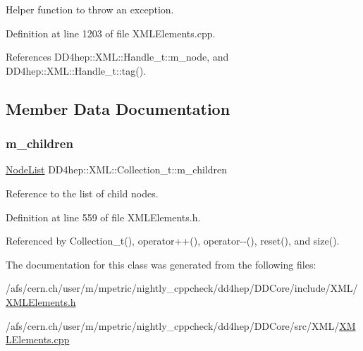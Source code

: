 Helper function to throw an exception. 



Definition at line 1203 of file X\+M\+L\+Elements.\+cpp.



References D\+D4hep\+::\+X\+M\+L\+::\+Handle\+\_\+t\+::m\+\_\+node, and D\+D4hep\+::\+X\+M\+L\+::\+Handle\+\_\+t\+::tag().



\subsection{Member Data Documentation}
\hypertarget{class_d_d4hep_1_1_x_m_l_1_1_collection__t_a258610612b270dbcadb7ddec5206387d}{}\label{class_d_d4hep_1_1_x_m_l_1_1_collection__t_a258610612b270dbcadb7ddec5206387d} 
\subsubsection{\texorpdfstring{m\+\_\+children}{m\_children}}
{\footnotesize\ttfamily \hyperlink{class_d_d4hep_1_1_x_m_l_1_1_node_list}{Node\+List} D\+D4hep\+::\+X\+M\+L\+::\+Collection\+\_\+t\+::m\+\_\+children}



Reference to the list of child nodes. 



Definition at line 559 of file X\+M\+L\+Elements.\+h.



Referenced by Collection\+\_\+t(), operator++(), operator-\/-\/(), reset(), and size().



The documentation for this class was generated from the following files\+:\begin{DoxyCompactItemize}
\item 
/afs/cern.\+ch/user/m/mpetric/nightly\+\_\+cppcheck/dd4hep/\+D\+D\+Core/include/\+X\+M\+L/\hyperlink{_x_m_l_elements_8h}{X\+M\+L\+Elements.\+h}\item 
/afs/cern.\+ch/user/m/mpetric/nightly\+\_\+cppcheck/dd4hep/\+D\+D\+Core/src/\+X\+M\+L/\hyperlink{_x_m_l_elements_8cpp}{X\+M\+L\+Elements.\+cpp}\end{DoxyCompactItemize}
